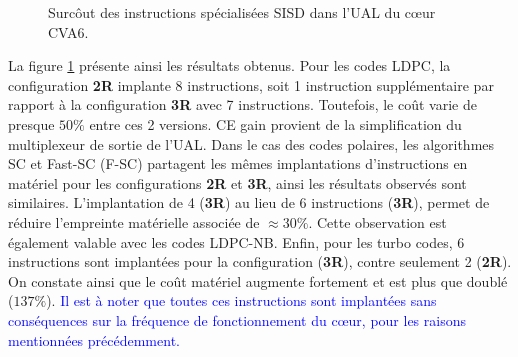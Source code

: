 \documentclass[../main.tex]{subfiles}
\begin{document}
\begin{figure}
    \center
    \caption{Surcôut des instructions spécialisées SISD dans l'UAL du cœur CVA6.}
    \label{tikz:alu_sisd}
\end{figure}
La figure \ref{tikz:alu_sisd} présente ainsi les résultats obtenus. 
Pour les codes LDPC, la configuration \textbf{2R} implante 8 instructions, soit 1 instruction supplémentaire par rapport à la configuration \textbf{3R} avec 7 instructions. Toutefois, le coût varie de presque $50\%$ entre ces 2 versions. CE gain provient de la simplification du multiplexeur de sortie de l'UAL.
Dans le cas des codes polaires, les algorithmes SC et Fast-SC (F-SC) partagent les mêmes implantations d'instructions en matériel pour les configurations \textbf{2R} et \textbf{3R}, ainsi les résultats observés sont similaires. L'implantation de 4 (\textbf{3R}) au lieu de 6 instructions (\textbf{3R}), permet de réduire l'empreinte matérielle associée de $\approx 30\%$.
Cette observation est également valable avec les codes LDPC-NB.
Enfin, pour les turbo codes, 6 instructions sont implantées pour la configuration (\textbf{3R}), contre seulement 2 (\textbf{2R}). On constate ainsi que le coût matériel augmente fortement et est plus que doublé ($137\%$). 
\textcolor{blue}{Il est à noter que toutes ces instructions sont implantées sans conséquences sur la fréquence de fonctionnement du cœur, pour les raisons mentionnées précédemment.}
\end{document}
